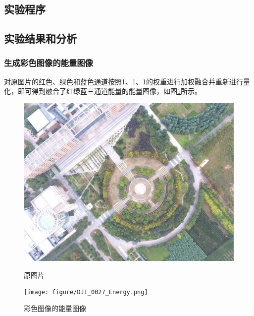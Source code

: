\subsection{实验程序}








\subsection{实验结果和分析}
\subsubsection{生成彩色图像的能量图像}
对原图片的红色、绿色和蓝色通道按照1、1、1的权重进行加权融合并重新进行量化，即可得到融合了红绿蓝三通道能量的能量图像，如图\ref{fig:dji0027energy}所示。
\begin{figure}[H]
	\centering	
	\begin{minipage}{0.45\linewidth}
		\includegraphics[width=\linewidth]{figure/DJI_0027_Compressed.png}
		\caption{原图片}
		\label{fig:dji0027original}
	\end{minipage}
	\begin{minipage}{0.45\linewidth}
		\texttt{[image: figure/DJI\_0027\_Energy.png]}
		\caption{彩色图像的能量图像}
		\label{fig:dji0027energy}
	\end{minipage}
\end{figure}
